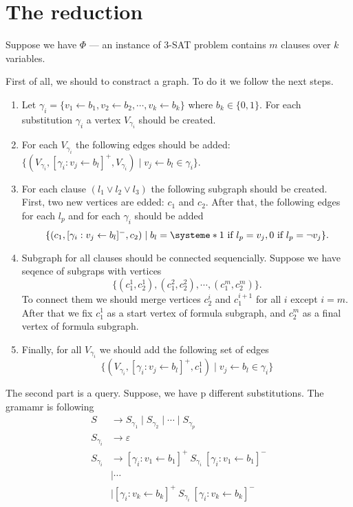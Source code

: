 \section{The reduction}

Suppose we have $\Phi$ --- an instance of 3-SAT problem contains $m$ clauses over $k$ variables.

First of all, we should to constract a graph. 
To do it we follow the next steps.
\begin{enumerate}
	\item 
	Let $\gamma_i = \{v_1 \leftarrow b_1, v_2 \leftarrow b_2, \cdots, v_k \leftarrow b_k\}$ where $b_k \in \{0,1\}$.
	For each substitution $\gamma_i$ a vertex $V_{\gamma_i}$ should be created.
	\item For each $V_{\gamma_i}$ the following edges should be added: $\{ (V_{\gamma_i}, [\gamma_i: v_j \leftarrow b_l]^+ ,V_{\gamma_i}) \mid v_j \leftarrow b_l \in \gamma_i \}$.
	\item For each clause $(l_1 \vee l_2 \vee l_3)$ the following subgraph should be created.
	First, two new vertices are edded: $c_1$ and $c_2$.
	After that, the following edges for each $l_p$ and for each $\gamma_i$ should be added $$\{(c_1, [\gamma_i: v_j \leftarrow b_l]^- ,c_2) \mid b_l = \systeme*{1 \text{ if } l_p = v_j, 0  \text{ if } l_p = \neg v_j} \}.$$
	\item Subgraph for all clauses should be connected sequencially. 
	Suppose we have seqence of subgraps with vertices $$\{(c_1^1,c_2^1),(c_1^2,c_2^2),\cdots,(c_1^m,c_2^m)\}.$$ To connect them we should merge vertices $c_2^{i}$ and $c_1^{i+1}$ for all $i$ except $i=m$.
	After that we fix $c_1^1$ as a start vertex of formula subgraph, and $c_2^m$ as a final vertex of formula subgraph.
    \item Finally, for all $V_{\gamma_i}$ we should add the following set of edges
    $$
    \{(V_{\gamma_i}, [\gamma_i: v_j \leftarrow b_l]^+ ,c_1^1) \mid v_j \leftarrow b_l \in \gamma_i\}
    $$
\end{enumerate}

The second part is a query.
Suppose, we have p different substitutions.
The gramamr is following
\begin{align*}
S & \to S_{\gamma_1} \mid S_{\gamma_2} \mid \cdots \mid S_{\gamma_p} \\
S_{\gamma_i} & \to \varepsilon \\
S_{\gamma_i} & \to [\gamma_i: v_1 \leftarrow b_1]^+ \ S_{\gamma_i} \ [\gamma_i: v_1 \leftarrow b_1]^-  \\
             & \mid \cdots \\
             & \mid  [\gamma_i: v_k \leftarrow b_k]^+ \ S_{\gamma_i} \ [\gamma_i: v_k \leftarrow b_k]^- \\ 
\end{align*}

